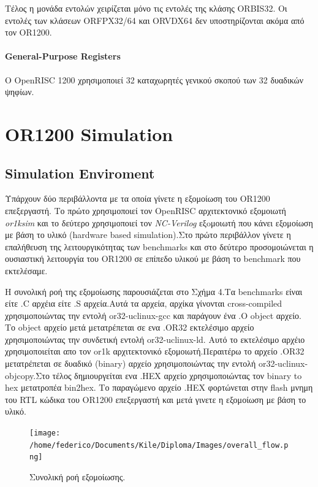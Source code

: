 \documentclass[a4paper,10pt]{article}
\numberwithin{figure}{section}
\numberwithin{table}{section}
\begin{document}
{Τέλος η μονάδα εντολών χειρίζεται μόνο τις εντολές της κλάσης ORBIS32. Οι εντολές των κλάσεων
ORFPX32/64 και ORVDX64 δεν υποστηρίζονται ακόμα από τον OR1200. 

\paragraph{General-Purpose Registers\newline\newline}

Ο OpenRISC 1200 χρησιμοποιεί 32 καταχωρητές γενικού σκοπού των 32 δυαδικών ψηφίων.
}



\section{OR1200 Simulation}{

\subsection{Simulation Enviroment}{
Υπάρχουν δύο περιβάλλοντα με τα οποία γίνετε η εξομοίωση του OR1200 επεξεργαστή.
Το πρώτο χρησιμοποιεί τον OpenRISC αρχιτεκτονικό εξομοιωτή \emph{or1ksim} και 
το δεύτερο χρησιμοποιεί τον \emph{NC-Verilog} εξoμοιωτή που κάνει εξομοίωση με βάση
το υλικό (hardware based simulation).Στο πρώτο περιβάλλον γίνετε η επαλήθευση
της λειτουργικότητας των benchmarks και στο δεύτερο προσομοιώνεται η ουσιαστική
λειτουργία του OR1200 σε επίπεδο υλικού με βάση το benchmark που εκτελέσαμε.\newline


Η συνολική ροή της εξομοίωσης παρουσιάζεται στο Σχήμα 4.Τα benchmarks είναι 
είτε .C αρχέια είτε .S αρχεία.Αυτά τα αρχεία, αρχίκα γίνονται cross-compiled
 χρησιμοποιώντας την εντολή or32-uclinux-gcc και παράγουν ένα .O object αρχείο.
Το object αρχείο μετά μετατρέπεται σε ενα .OR32 εκτελέσιμο αρχείο χρησιμοποιώντας
την συνδετική εντολή or32-uclinux-ld. Αυτό το εκτελέσιμο αρχέιο χρησιμοποιείται
απο τον or1k αρχιτεκτονικό εξομοιωτή.Περαιτέρω το αρχείο .OR32 μετατρέπεται σε
δυαδικό (binary) αρχείο χρησιμοποιώντας την εντολή or32-uclinux-objcopy.Στο τέλος
δημιουργείται ενα .HEX αρχείο χρησιμοποιώντας τον binary to hex μετατροπέα
 bin2hex. Το παραγώμενο αρχείο .HEX φορτώνεται στην flash μνημη του RTL κώδικα
του OR1200 επεξεργαστή και μετά γινετε η εξομοίωση με βάση το υλικό.
 
\begin{figure}[h!]
 \centering
 \texttt{[image: /home/federico/Documents/Kile/Diploma/Images/overall\_flow.png]}
 \caption{Συνολική ροή εξομοίωσης.}
\end{figure}


}}
\end{document}
